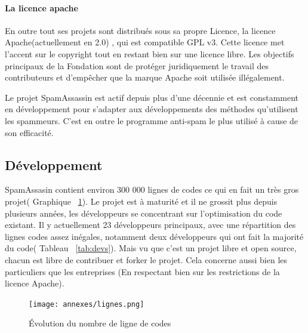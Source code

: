\documentclass[a4paper,11pt]{article}
\begin{document}
\paragraph{La licence apache}
En outre tout ses projets sont distribués sous sa propre Licence, la licence Apache(actuellement en 2.0) , qui est compatible GPL v3.
Cette licence met l’accent sur le copyright tout en restant bien sur une licence libre. Les objectifs principaux de la Fondation sont de protéger 
juridiquement le travail des contributeurs et d'empêcher que la marque Apache soit utilisée illégalement.

Le projet SpamAssassin est actif depuis plus d'une décennie et est constamment en développement 
pour s'adapter aux développements des méthodes qu'utilisent les spammeurs. C'est en outre le programme anti-spam le plus utilisé à cause de son efficacité.

\subsection{Développement}

SpamAssasin contient environ 300 000 lignes de codes ce qui en fait un très gros projet( Graphique ~\ref{fig:code}).
Le projet est à maturité et il ne grossit plus depuis plusieurs années, les développeurs se concentrant sur l'optimisation du code existant.
Il y actuellement 23 développeurs principaux, avec une répartition des lignes codes assez inégales, notamment deux développeurs qui ont fait la majorité du code( Tableau ~\ref{tab:devs}).
Mais vu que c'est un projet libre et open source, chacun est libre de contribuer et forker le projet. Cela concerne aussi 
bien les particuliers que les entreprises (En respectant bien sur les restrictions de la licence Apache).

\begin{figure}[h!]
 \texttt{[image: annexes/lignes.png]}
  \caption{Évolution du nombre de ligne de codes}
  \label {fig:code}
\end{figure}
\end{document}
